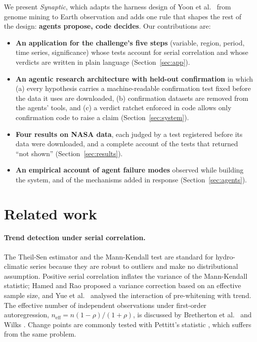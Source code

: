 \documentclass[11pt,a4paper]{article}
\begin{document}
We present \emph{Synaptic}, which adapts the harness design of Yoon et al.\ \citep{yoon2026} from genome mining to
Earth observation and adds one rule that shapes the rest of the design: \textbf{agents propose, code decides}. Our
contributions are:

\begin{itemize}
  \item \textbf{An application for the challenge's five steps} (variable, region, period, time series, significance)
        whose tests account for serial correlation and whose verdicts are written in plain language
        (Section~\ref{sec:app}).
  \item \textbf{An agentic research architecture with held-out confirmation} in which (a) every hypothesis carries a
        machine-readable confirmation test fixed before the data it uses are downloaded, (b) confirmation datasets are
        removed from the agents' tools, and (c) a verdict ratchet enforced in code allows only confirmation code to
        raise a claim (Section~\ref{sec:system}).
  \item \textbf{Four results on NASA data}, each judged by a test registered before its data were downloaded, and a
        complete account of the tests that returned ``not shown'' (Section~\ref{sec:results}).
  \item \textbf{An empirical account of agent failure modes} observed while building the system, and of the
        mechanisms added in response (Section~\ref{sec:agents}).
\end{itemize}

\section{Related work}
\label{sec:related}

\paragraph{Trend detection under serial correlation.} The Theil-Sen estimator \citep{theil1950,sen1968} and the
Mann-Kendall test \citep{mann1945,kendall1975} are standard for hydro-climatic series because they are robust to
outliers and make no distributional assumption. Positive serial correlation inflates the variance of the Mann-Kendall
statistic; Hamed and Rao \citep{hamed1998} proposed a variance correction based on an effective sample size, and Yue et
al.\ \citep{yue2002} analysed the interaction of pre-whitening with trend. The effective number of independent
observations under first-order autoregression, $n_{\mathrm{eff}} = n(1-\rho)/(1+\rho)$, is discussed by Bretherton et
al.\ \citep{bretherton1999} and Wilks \citep{wilks2011}. Change points are commonly tested with Pettitt's statistic
\citep{pettitt1979}, which suffers from the same problem.
\end{document}
